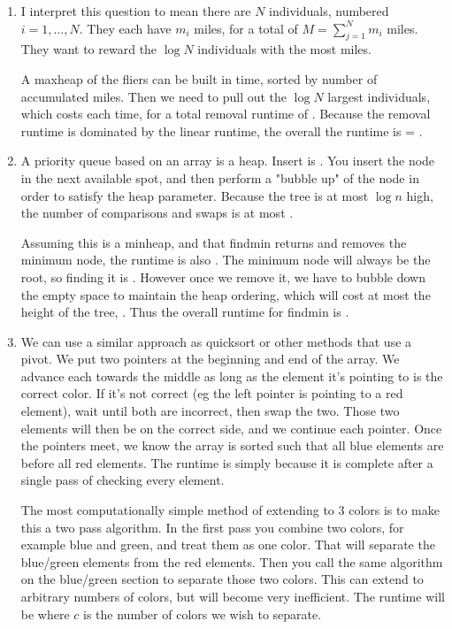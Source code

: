 \documentclass[12pt]{chmullighw}
\begin{document}
\begin{enumerate}

\item I interpret this question to mean there are $N$ individuals, numbered
$ i = 1, \ldots, N$. They each have $m_i$ miles, for a total of
$M = \sum_{j=1}^{N}m_i$ miles. They want to reward the $\log N$ individuals 
with the most miles.

A maxheap of the fliers can be built in  time, sorted by number of accumulated miles. Then we need to pull out the $\log N$ largest individuals, which costs  each time, for a total removal runtime of . Because the removal runtime is dominated by the linear runtime, the overall the runtime is  = .


\item A priority queue based on an array is a heap. Insert is . You insert the node in the next available spot, and then perform a "bubble up" of the node in order to satisfy the heap parameter. Because the tree is at most $\log n$ high, the number of comparisons and swaps is at most .

Assuming this is a minheap, and that findmin returns and removes the minimum node, the runtime is also . The minimum node will always be the root, so finding it is . However once we remove it, we have to bubble down the empty space to maintain the heap ordering, which will cost at most the height of the tree, . Thus the overall runtime for findmin is .


\item We can use a similar approach as quicksort or other methods that use a pivot. We put two pointers at the beginning and end of the array. We advance each towards the middle as long as the element it's pointing to is the correct color. If it's not correct (eg the left pointer is pointing to a red element), wait until both are incorrect, then swap the two. Those two elements will then be on the correct side, and we continue each pointer. Once the pointers meet, we know the array is sorted such that all blue elements are before all red elements. The runtime is simply  because it is complete after a single pass of checking every element.

The most computationally simple method of extending to 3 colors is to make this a two pass algorithm. In the first pass you combine two colors, for example blue and green, and treat them as one color. That will separate the blue/green elements from the red elements. Then you call the same algorithm on the blue/green section to separate those two colors. This can extend to arbitrary numbers of colors, but will become very inefficient. The runtime will be  where $c$ is the number of colors we wish to separate.



\end{enumerate}
\end{document}
